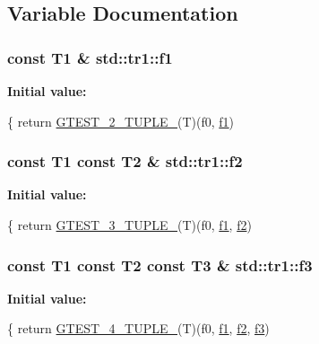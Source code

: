 \subsection{Variable Documentation}
\hypertarget{namespacestd_1_1tr1_a9c0fa65b105f8e2f58ba59ecf75fd000}{
\subsubsection[{f1}]{\setlength{\rightskip}{0pt plus 5cm}const T1 \& std\+::tr1\+::f1}}\label{namespacestd_1_1tr1_a9c0fa65b105f8e2f58ba59ecf75fd000}
{\bfseries Initial value\+:}
\begin{DoxyCode}
\{
  \textcolor{keywordflow}{return} \hyperlink{gtest-tuple_8h_a93229c3f009273c73eca237b4d19f326}{GTEST\_2\_TUPLE\_}(T)(f0, \hyperlink{namespacestd_1_1tr1_a9c0fa65b105f8e2f58ba59ecf75fd000}{f1})
\end{DoxyCode}
\hypertarget{namespacestd_1_1tr1_a87dd9e009868361317f587126dba63d4}{
\subsubsection[{f2}]{\setlength{\rightskip}{0pt plus 5cm}const T1 const T2 \& std\+::tr1\+::f2}}\label{namespacestd_1_1tr1_a87dd9e009868361317f587126dba63d4}
{\bfseries Initial value\+:}
\begin{DoxyCode}
\{
  \textcolor{keywordflow}{return} \hyperlink{gtest-tuple_8h_af2c3eab3f1a5197b408fce44eb3ed9da}{GTEST\_3\_TUPLE\_}(T)(f0, \hyperlink{namespacestd_1_1tr1_a9c0fa65b105f8e2f58ba59ecf75fd000}{f1}, \hyperlink{namespacestd_1_1tr1_a87dd9e009868361317f587126dba63d4}{f2})
\end{DoxyCode}
\hypertarget{namespacestd_1_1tr1_a0f7c3b47d27d42d82d1a333ea420ce4e}{
\subsubsection[{f3}]{\setlength{\rightskip}{0pt plus 5cm}const T1 const T2 const T3 \& std\+::tr1\+::f3}}\label{namespacestd_1_1tr1_a0f7c3b47d27d42d82d1a333ea420ce4e}
{\bfseries Initial value\+:}
\begin{DoxyCode}
\{
  \textcolor{keywordflow}{return} \hyperlink{gtest-tuple_8h_a3625feb24d5e6eb9926fd558e4a2e3ff}{GTEST\_4\_TUPLE\_}(T)(f0, \hyperlink{namespacestd_1_1tr1_a9c0fa65b105f8e2f58ba59ecf75fd000}{f1}, \hyperlink{namespacestd_1_1tr1_a87dd9e009868361317f587126dba63d4}{f2}, \hyperlink{namespacestd_1_1tr1_a0f7c3b47d27d42d82d1a333ea420ce4e}{f3})
\end{DoxyCode}
